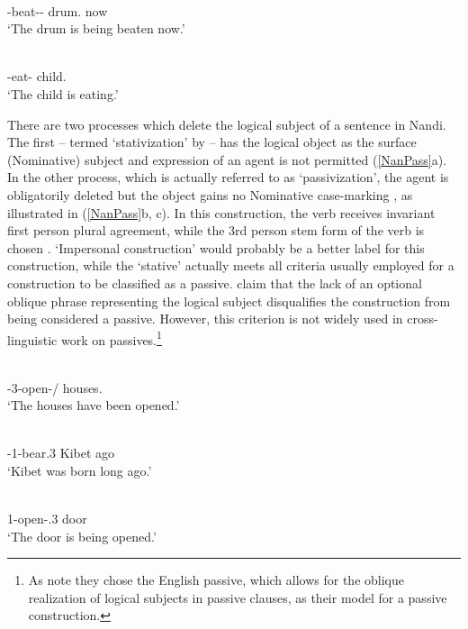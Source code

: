 \begin{exe}\ex{}
\begin{xlist}
\ex\label{TenPass}\gll{} \textbf{} \\
\ipfv{}-beat-\epen{}-\pass{} drum.\nom{} now\\
\glt `The drum is being beaten now.' 

\ex\label{TenAntiPass}\gll{} \textbf{}\\
\ipfv{}-eat-\antip{} child.\nom{}\\
\glt `The child is eating.'  
\end{xlist}
\end{exe}

There are two processes which delete the logical subject of a sentence in Nandi. 
The first -- termed `stativization' by \citeauthor{Creider:1989} -- has the logical object as the surface (Nominative) subject and expression of an agent is not permitted (\ref{NanPass}a).
In the other process, which is actually referred to as `passivization', the agent is obligatorily deleted but the object gains no Nominative case-marking \citep[125--126]{Creider:1989}, as illustrated in (\ref{NanPass}b, c). 
In this construction, the verb receives invariant first person plural agreement, while the 3rd person stem form of the verb is chosen \citep[100]{Creider:1989}. `Impersonal construction' would probably be a better label for this construction, while the `stative' actually meets all criteria usually employed for a construction to be classified as a passive. \citet{Creider:1989} claim that the lack of an optional oblique phrase representing the logical subject disqualifies the construction from being considered a passive. 
However, this criterion is not widely used in cross-linguistic work on passives.\footnote{As \citet[100]{Creider:1989} note they chose the English passive, which allows for the oblique realization of logical subjects in passive clauses, as their model for a passive construction.}

\begin{exe}\ex\label{NanPass}
\begin{xlist}\ex\gll{} \textbf{}\\
\pst{}-3-open-\stat{}/\pass{} houses.\nom{}\\
\glt `The houses have been opened.'%

\ex\gll{}   \\
\pst{}-1\pl{}-bear.3 Kibet ago\\
\glt `Kibet was born long ago.'

\ex\gll{} \\
1\pl{}-open-\ipfv{}.3 door\\
\glt `The door is being opened.' 
\end{xlist}%
\end{exe}


